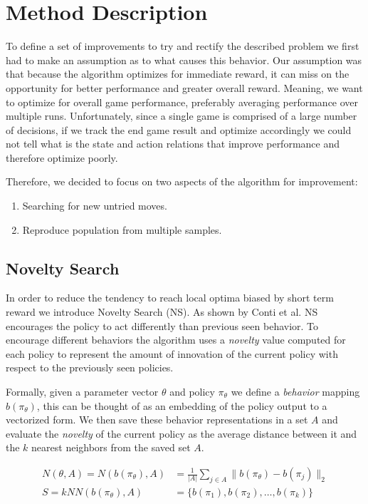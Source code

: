 \documentclass[11 pt, twocolumn]{article}
\begin{document}
\section{Method Description}
To define a set of improvements to try and rectify the described problem we first had to make an assumption as to what causes this behavior. Our assumption was that because the algorithm optimizes for immediate reward, it can miss on the opportunity for better performance and greater overall reward. Meaning, we want to optimize for overall game performance, preferably averaging performance over multiple runs. Unfortunately, since a single game is comprised of a large number of decisions, if we track the end game result and optimize accordingly we could not tell what is the state and action relations that improve performance and therefore optimize poorly.

Therefore, we decided to focus on two aspects of the algorithm for improvement:
\begin{enumerate}
	\item Searching for new untried moves.
	\item Reproduce population from multiple samples.
\end{enumerate}

\subsection{Novelty Search}
In order to reduce the tendency to reach local optima biased by short term reward we introduce Novelty Search (NS). As shown by Conti et al. NS encourages the policy to act differently than previous seen behavior. To encourage different behaviors the algorithm uses a \emph{novelty} value computed for each policy to represent the amount of innovation of the current policy with respect to the previously seen policies.

Formally, given a parameter vector $\theta$  and policy $\pi_\theta$ we define a \emph{behavior} mapping $b(\pi_\theta)$, this can be thought of as an embedding of the policy output to a vectorized form. We then save these behavior representations in a set $A$ and evaluate the \emph{novelty} of the current policy as the average distance between it and the $k$ nearest neighbors from the saved set $A$.

\begin{align*}
N(\theta, A)=N(b(\pi_\theta),A)&=\frac{1}{|A|}\sum_{j\in A} \|b(\pi_\theta)-b(\pi_j)\|_2\\
S=kNN(b(\pi_\theta),A)&=\{b(\pi_1),b(\pi_2), \dots,b(\pi_k)\}
\end{align*}
\end{document}
